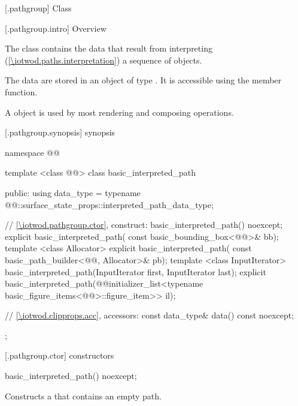  [\iotwod.pathgroup] {Class }

 [\iotwod.pathgroup.intro] {Overview}

\pnum
{}%
The class  contains the data that result from interpreting (\ref{\iotwod.paths.interpretation}) a sequence of  objects.

\pnum
The data are stored in an object of type . It is accessible using the  member function.

\pnum
A  object is used by most rendering and composing operations.

 [\iotwod.pathgroup.synopsis] { synopsis}

\begin{codeblock}
namespace @\fullnamespace{}@ {
  template <class @\graphicssurfacestemplparamnospace{}@>
  class basic_interpreted_path {
  public:
    using data_type = typename 
      @\graphicssurfacestemplparamnospace{}@::surface_state_props::interpreted_path_data_type;
      
    // \ref{\iotwod.pathgroup.ctor}, construct:
    basic_interpreted_path() noexcept;
    explicit basic_interpreted_path(
      const basic_bounding_box<@\graphicsmathtemplparamnospace{}@>& bb);
    template <class Allocator>
    explicit basic_interpreted_path(
      const basic_path_builder<@\graphicssurfacestemplparamnospace{}@, Allocator>& pb);
    template <class InputIterator>
    basic_interpreted_path(InputIterator first, InputIterator last);
    explicit basic_interpreted_path(@\stdqualifier{}@initializer_list<typename
      basic_figure_items<@\graphicssurfacestemplparamnospace{}@>::figure_item>> il);    
    
    // \ref{\iotwod.clipprops.acc}, accessors:
    const data_type& data() const noexcept;
  };
}
\end{codeblock}

 [\iotwod.pathgroup.ctor] { constructors}

%
\begin{itemdecl}
basic_interpreted_path() noexcept;
\end{itemdecl}
\begin{itemdescr}
\pnum
\effects
Constructs a  that contains an empty path.
\end{itemdescr}

